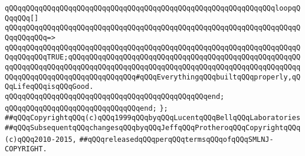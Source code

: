 \verb|qQQqqQQqqQQqqQQqqQQqqQQqqQQqqQQqqQQqqQQqqQQqqQQqqQQqqQQqqQQqqQQqloopqQQqqQQq[]|\newline
\verb|qQQqqQQqqQQqqQQqqQQqqQQqqQQqqQQqqQQqqQQqqQQqqQQqqQQqqQQqqQQqqQQqqQQqqQQqqQQqqQQq=>|\newline
\verb|qQQqqQQqqQQqqQQqqQQqqQQqqQQqqQQqqQQqqQQqqQQqqQQqqQQqqQQqqQQqqQQqqQQqqQQqqQQqqQQqTRUE;qQQqqQQqqQQqqQQqqQQqqQQqqQQqqQQqqQQqqQQqqQQqqQQqqQQqqQQqqQQqqQQqqQQqqQQqqQQqqQQqqQQqqQQqqQQqqQQqqQQqqQQqqQQqqQQqqQQqqQQqqQQqqQQqqQQqqQQqqQQqqQQqqQQqqQQqqQQq#qQQqEverythingqQQqbuiltqQQqproperly,qQQqLifeqQQqisqQQqGood.|\newline
\verb|qQQqqQQqqQQqqQQqqQQqqQQqqQQqqQQqqQQqqQQqqQQqqQQqend;|\newline
\verb|qQQqqQQqqQQqqQQqqQQqqQQqqQQqqQQqend;|\newline
\verb|};|\newline
\newline
\newline
\verb|##qQQqCopyrightqQQq(c)qQQq1999qQQqbyqQQqLucentqQQqBellqQQqLaboratories|\newline
\verb|##qQQqSubsequentqQQqchangesqQQqbyqQQqJeffqQQqProtheroqQQqCopyrightqQQq(c)qQQq2010-2015,|\newline
\verb|##qQQqreleasedqQQqperqQQqtermsqQQqofqQQqSMLNJ-COPYRIGHT.|\newline

